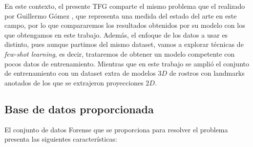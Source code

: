     \medskip

    \noindent En este contexto, el presente TFG comparte el mismo problema que el realizado por Guillermo Gómez \cite{guillermo2019}, que representa una medida del estado del arte en este campo, por lo que compararemos los resultados obtenidos por su modelo con los que obtengamos en este trabajo. Además, el enfoque de los datos a usar es distinto, pues aunque partimos del mismo dataset, vamos a explorar técnicas de \textit{few-shot learning}, es decir, trataremos de obtener un modelo competente con pocos datos de entrenamiento. Mientras que en este trabajo se amplió el conjunto de entrenamiento con un dataset extra de modelos $3D$ de rostros con landmarks anotados de los que se extrajeron proyecciones $2D$.



    \subsection{Base de datos proporcionada}
        \noindent El conjunto de datos Forense que se proporciona para resolver el problema presenta las siguientes características: 

